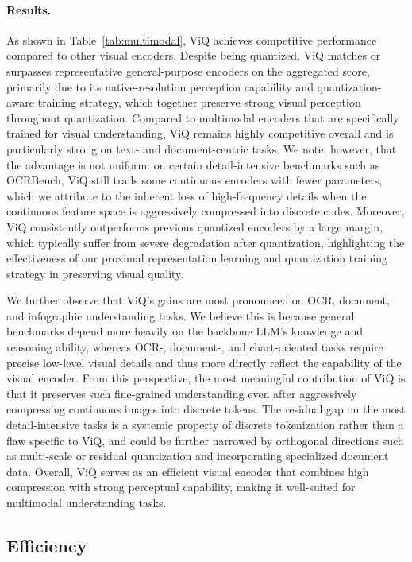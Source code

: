 \paragraph{Results.} As shown in Table~\ref{tab:multimodal}, ViQ achieves competitive performance compared to other visual encoders. Despite being quantized, ViQ matches or surpasses representative general-purpose encoders on the aggregated score, primarily due to its native-resolution perception capability and quantization-aware training strategy, which together preserve strong visual perception throughout quantization. Compared to multimodal encoders that are specifically trained for visual understanding, ViQ remains highly competitive overall and is particularly strong on text- and document-centric tasks. We note, however, that the advantage is not uniform: on certain detail-intensive benchmarks such as OCRBench, ViQ still trails some continuous encoders with fewer parameters, which we attribute to the inherent loss of high-frequency details when the continuous feature space is aggressively compressed into discrete codes. Moreover, ViQ consistently outperforms previous quantized encoders by a large margin, which typically suffer from severe degradation after quantization, highlighting the effectiveness of our proximal representation learning and quantization training strategy in preserving visual quality.

We further observe that ViQ's gains are most pronounced on OCR, document, and infographic understanding tasks. We believe this is because general benchmarks depend more heavily on the backbone LLM's knowledge and reasoning ability, whereas OCR-, document-, and chart-oriented tasks require precise low-level visual details and thus more directly reflect the capability of the visual encoder. From this perspective, the most meaningful contribution of ViQ is that it preserves such fine-grained understanding even after aggressively compressing continuous images into discrete tokens. The residual gap on the most detail-intensive tasks is a systemic property of discrete tokenization rather than a flaw specific to ViQ, and could be further narrowed by orthogonal directions such as multi-scale or residual quantization and incorporating specialized document data. Overall, ViQ serves as an efficient visual encoder that combines high compression with strong perceptual capability, making it well-suited for multimodal understanding tasks.

\subsection{Efficiency}

